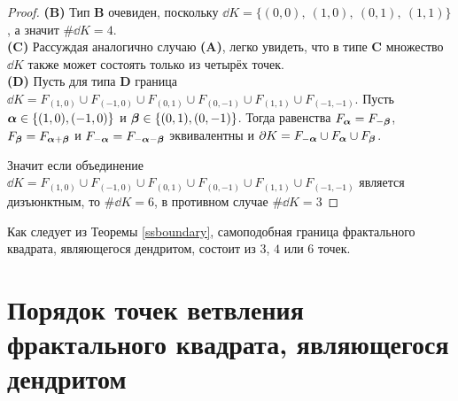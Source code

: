 \begin{proof}
{\bf (B)} Тип {\bf B} очевиден, поскольку $\dd K=\{(0,0),\ (1,0),\ (0,1),\ (1,1)\}$, а значит $\#\dd K=4$.\\

{\bf (C)} Рассуждая аналогично случаю {\bf (A)}, легко увидеть, что в типе {\bf C} множество $\dd K$ также может состоять только из четырёх точек. \\

{\bf (D)} Пусть для типа {\bf D} граница $\dd K=F_{(1,0)}\cup F_{(-1,0)}\cup F_{(0,1)}\cup F_{(0,-1)}\cup F_{(1,1)}\cup F_{(-1,-1)}$.
Пусть ${\bm{\alpha}}\in\{(1,0),(-1,0)\}$ и ${\bm{\beta}}\in\{(0,1),(0,-1)\}$.
Тогда равенства $F_{\bm{\alpha}}=F_{-{\bm{\beta}}}$, $F_{{\bm{\beta}}}=F_{{\bm{\alpha}}+{\bm{\beta}}}$ и $F_{-{\bm{\alpha}}}=F_{-{\bm{\alpha}}-{\bm{\beta}}}$ эквивалентны и $\partial K=F_{-{\bm{\alpha}}}\cup F_{\bm{\alpha}}\cup F_{\bm{\beta}}$. 

Значит если объединение $\dd K=F_{(1,0)}\cup F_{(-1,0)}\cup F_{(0,1)}\cup F_{(0,-1)}\cup F_{(1,1)}\cup F_{(-1,-1)}$ является дизъюнктным, то $\#\dd K=6$, в противном случае $\#\dd K=3$
\end{proof}

Как следует из Теоремы \ref{ssboundary}, самоподобная граница фрактального квадрата, являющегося дендритом, состоит из $3$, $4$ или $6$ точек.





\section{Порядок точек ветвления фрактального квадрата, являющегося дендритом}

